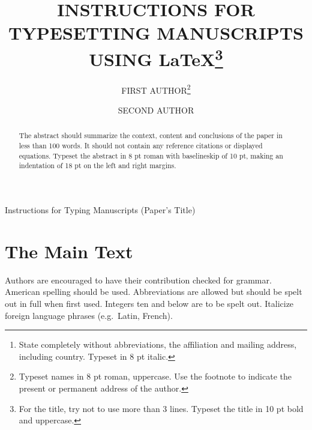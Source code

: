 \documentclass{ws-ijcm}
\begin{document}
%
\catchline{}{}{}{}{}
%

{Instructions for Typing Manuscripts (Paper's Title)}

\title{INSTRUCTIONS FOR TYPESETTING MANUSCRIPTS \\
USING \LaTeX\footnote{For the title, try not 
to use more than 3 lines. Typeset the title in 10 pt bold and uppercase.}
}

\author{FIRST AUTHOR\footnote{Typeset names in 8 pt roman, 
uppercase. Use the footnote to indicate the
present or permanent address of the author.}}

\address{University Department, University Name, Address\\
City, State ZIP/Zone,Country\,\footnote{State completely 
without abbreviations, the affiliation and mailing address, including
country. Typeset in 8 pt italic.}\\
  }

\author{SECOND AUTHOR}

\address{Group, Laboratory, Address\\
City, State ZIP/Zone, Country\\
author\_id@domain\_name
}

\maketitle

\begin{history}
\end{history}

\begin{abstract}
The abstract should summarize the context, content and conclusions of
the paper in less than 100 words. It should not contain any reference
citations or displayed equations. Typeset the abstract in 8 pt roman  
with baselineskip of 10 pt, making an indentation of 18 pt on the 
left and right margins.
\end{abstract}


\section{The Main Text}
Authors are encouraged to have their contribution checked for grammar.
American spelling should be used. Abbreviations are allowed but should
be spelt out in full when first used. Integers ten and below are to be
spelt out. Italicize foreign language phrases (e.g.~Latin, French).
\end{document}
